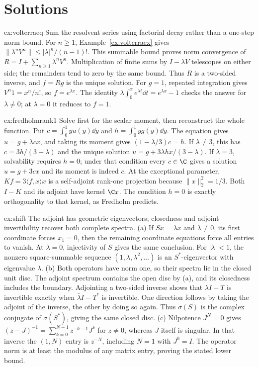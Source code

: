 \section{Solutions}

\begin{solution}{ex:volterraeq}
\idea Sum the resolvent series using factorial decay rather than a one-step norm bound.
\writeup For $n\ge1$, Example~\ref{ex:volterraex} gives $\|\lambda^nV^n\|\le|\lambda|^n/(n-1)!$. This summable bound proves norm convergence of $R=I+\sum_{n\ge1}\lambda^nV^n$. Multiplication of finite sums by $I-\lambda V$ telescopes on either side; the remainders tend to zero by the same bound. Thus $R$ is a two-sided inverse, and $f=Rg$ is the unique solution. For $g=1$, repeated integration gives $V^n1=x^n/n!$, so $f=e^{\lambda x}$. The identity $\lambda\int_0^xe^{\lambda t}\dd t=e^{\lambda x}-1$ checks the answer for $\lambda\ne0$; at $\lambda=0$ it reduces to $f=1$.
\end{solution}

\begin{solution}{ex:fredholmrank1}
\idea Solve first for the scalar moment, then reconstruct the whole function.
\writeup Put $c=\int_0^1yu(y)\dd y$ and $h=\int_0^1yg(y)\dd y$. The equation gives $u=g+\lambda cx$, and taking its moment gives $(1-\lambda/3)c=h$.
If $\lambda\ne3$, this has $c=3h/(3-\lambda)$ and the unique solution $u=g+3\lambda hx/(3-\lambda)$. If $\lambda=3$, solvability requires $h=0$; under that condition every $c\in\C$ gives a solution $u=g+3cx$ and its moment is indeed $c$.
At the exceptional parameter, $Kf=3\langle f,x\rangle x$ is a self-adjoint rank-one projection because $\|x\|_2^2=1/3$. Both $I-K$ and its adjoint have kernel $\C x$. The condition $h=0$ is exactly orthogonality to that kernel, as Fredholm predicts.
\end{solution}

\begin{solution}{ex:shift}
\idea The adjoint has geometric eigenvectors; closedness and adjoint invertibility recover both complete spectra.
\writeup (a) If $Sx=\lambda x$ and $\lambda\ne0$, its first coordinate forces $x_1=0$, then the remaining coordinate equations force all entries to vanish. At $\lambda=0$, injectivity of $S$ gives the same conclusion. For $|\lambda|<1$, the nonzero square-summable sequence $(1,\lambda,\lambda^2,\ldots)$ is an $S^*$-eigenvector with eigenvalue $\lambda$.
(b) Both operators have norm one, so their spectra lie in the closed unit disc. The adjoint spectrum contains the open disc by (a), and its closedness includes the boundary. Adjointing a two-sided inverse shows that $\lambda I-T$ is invertible exactly when $\bar\lambda I-T^*$ is invertible. One direction follows by taking the adjoint of the inverse, the other by doing so again. Thus $\sigma(S)$ is the complex conjugate of $\sigma(S^*)$, giving the same closed disc.
(c) Nilpotence $J^N=0$ gives $(z-J)^{-1}=\sum_{k=0}^{N-1}z^{-k-1}J^k$ for $z\ne0$, whereas $J$ itself is singular. In that inverse the $(1,N)$ entry is $z^{-N}$, including $N=1$ with $J^0=I$. The operator norm is at least the modulus of any matrix entry, proving the stated lower bound.
\end{solution}

